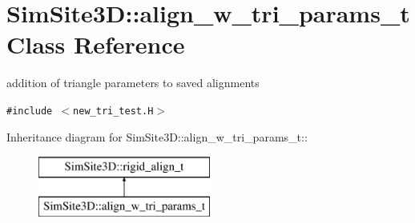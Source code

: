 \section{SimSite3D::align\_\-w\_\-tri\_\-params\_\-t Class Reference}
\label{classSimSite3D_1_1align__w__tri__params__t}
addition of triangle parameters to saved alignments  


{\tt \#include $<$new\_\-tri\_\-test.H$>$}

Inheritance diagram for SimSite3D::align\_\-w\_\-tri\_\-params\_\-t::\begin{figure}[H]
\begin{center}
\leavevmode
\includegraphics[height=2cm]{classSimSite3D_1_1align__w__tri__params__t}
\end{center}
\end{figure}
